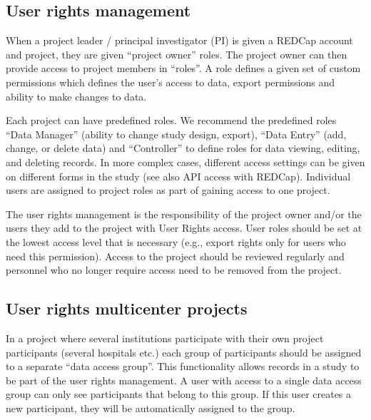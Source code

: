 \documentclass[letterpaper,10pt,english]{sphinxmanual}
\begin{document}
\subsection{User rights management}
\label{\detokenize{ServerAdmin/index:user-rights-management}}
\sphinxAtStartPar
When a project leader / principal investigator (PI) is given a REDCap account and project, they are given “project owner” roles. The project owner can then provide access to project members in “roles”. A role defines a given set of custom permissions which defines the user’s access to data, export permissions and ability to make changes to data.

\sphinxAtStartPar
Each project can have predefined roles. We recommend the predefined roles “Data Manager” (ability to change study design, export), “Data Entry” (add, change, or delete data) and “Controller” to define roles for data viewing, editing, and deleting records. In more complex cases, different access settings can be given on different forms in the study (see also API access with REDCap). Individual users are assigned to project roles as part of gaining access to one project.

\sphinxAtStartPar
The user rights management is the responsibility of the project owner and/or the users they add to the project with User Rights access. User roles should be set at the lowest access level that is necessary (e.g., export rights only for users who need this permission). Access to the project should be reviewed regularly and personnel who no longer require access need to be removed from the project.


\subsection{User rights \textendash{} multi\sphinxhyphen{}center projects}
\label{\detokenize{ServerAdmin/index:user-rights-multi-center-projects}}
\sphinxAtStartPar
In a project where several institutions participate with their own project participants (several hospitals etc.) each group of participants should be assigned to a separate “data access group”. This functionality allows records in a study to be part of the user rights management. A user with access to a single data access group can only see participants that belong to this group. If this user creates a new participant, they will be automatically assigned to the group.
\end{document}
